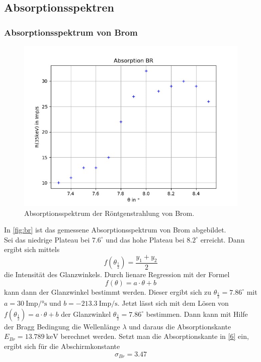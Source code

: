 \subsection{Absorptionsspektren}
\label{subsec:absorptionsspektrum}


\subsubsection*{Absorptionsspektrum von Brom}
\label{brom}

\begin{figure}[H]
  \centering
  \includegraphics{content/Br.png}
  \caption{Absorptionsspektrum der Röntgenstrahlung von Brom.}
  \label{fig:br}
\end{figure}
In \autoref{fig:br} ist das gemessene Absorptionsspektrum von Brom abgebildet.\\
Sei das niedrige Plateau bei $7.6^\circ$ und das hohe Plateau bei $8.2^\circ$ erreicht. Dann ergibt sich mittels 
\begin{equation*}
  f(\theta_{\frac{1}{2}})=\frac{y_1 +y_2}{2}
\end{equation*}
die Intensität des Glanzwinkels. Durch lienare Regression mit der Formel
\begin{equation}
  f(\theta)=a\cdot\theta + b
  \label{reg}
\end{equation}
kann dann der Glanzwinkel bestimmt werden. Dieser ergibt sich zu $\theta_{\frac{1}{2}}=7.86^\circ$ mit $a=30\ \textrm{Imp/°s}$ und $b=-213.3\ \textrm{Imp/s}$.
Jetzt lässt sich mit dem Lösen von $f(\theta_{\frac{1}{2}})=a\cdot\theta + b$ der Glanzwinkel $\theta_{\frac{1}{2}}=7.86^\circ$ bestimmen. Dann kann mit Hilfe der Bragg Bedingung die Wellenlänge $\lambda$ und daraus die Absorptionskante $E_{Br}=13.789\ \textrm{keV}$ berechnet werden.
Setzt man die Absorptionskante in \eqref{6} ein, ergibt sich für die Abschirmkonstante 
\begin{equation*}
  \sigma_{Br}=3.47
\end{equation*}




